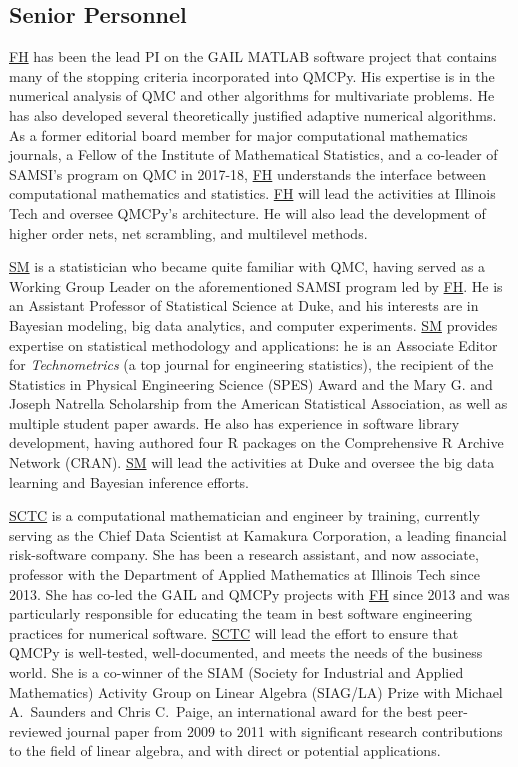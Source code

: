 \documentclass[11pt]{NSFamsart}
\newcommand{\FH}{\hyperlink{FHlink}{FH}\xspace}
\newcommand{\SM}{\hyperlink{SMlink}{SM}\xspace}
\newcommand{\SCTC}{\hyperlink{SCTClink}{SCTC}\xspace}
\begin{document}
\subsection{Senior Personnel}
\FH has been the lead PI on the GAIL \cite{ChoEtal20a} MATLAB software project that contains many of the stopping criteria incorporated into QMCPy.  His expertise is in the numerical analysis of QMC and other algorithms for multivariate problems.  He has also developed several theoretically justified adaptive numerical algorithms.  As a former editorial board member for major computational mathematics journals, a Fellow of the Institute of Mathematical Statistics, and a co-leader of SAMSI's program on QMC in 2017-18, \FH understands the interface between computational mathematics and statistics.  \FH will lead the activities at Illinois Tech and oversee QMCPy's architecture.  He will also lead the development of higher order nets, net scrambling, and multilevel methods.

\SM is a statistician who became quite familiar with QMC, having served as a Working Group Leader on the aforementioned SAMSI program led by \FH. He is an Assistant Professor of Statistical Science at Duke, and his interests are in Bayesian modeling, big data analytics, and computer experiments. \SM provides expertise on statistical methodology and applications: he is an Associate Editor for \textit{Technometrics} (a top journal for engineering statistics), the recipient of the Statistics in Physical Engineering Science (SPES) Award and the Mary G. and Joseph Natrella Scholarship from the American Statistical Association, as well as multiple student paper awards. He also has experience in software library development, having authored four \textsc{R} packages \cite{support,minimaxdesign,cmenet,atmopt} on the Comprehensive R Archive Network (CRAN). \SM will lead the activities at Duke and oversee the big data learning and Bayesian inference efforts.

\SCTC is a computational mathematician and engineer by training, currently serving as the Chief Data Scientist at Kamakura Corporation, a leading financial risk-software company.  She has been a research assistant, and now associate, professor with the Department of Applied Mathematics at Illinois Tech since 2013.  She has co-led the GAIL and QMCPy projects with \FH  since 2013 and was particularly responsible for educating the team in best software engineering practices for numerical software.  \SCTC will lead the effort to ensure that QMCPy is well-tested, well-documented, and meets the needs of the business world. She is a co-winner of the SIAM (Society for Industrial and Applied Mathematics) Activity Group on Linear Algebra (SIAG/LA) Prize with Michael A.~Saunders and Chris C.~Paige, an international
award for the best peer-reviewed journal paper from 2009 to 2011 with significant research contributions to the field of linear algebra, and with direct or potential applications.
\end{document}
